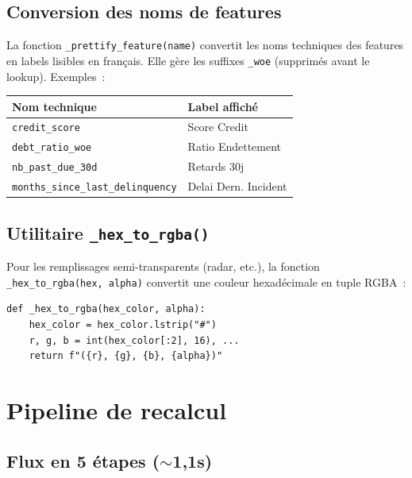 \documentclass[12pt,a4paper]{article}
\begin{document}
\subsection{Conversion des noms de features}

La fonction \texttt{\_prettify\_feature(name)} convertit les noms techniques des features en labels lisibles en fran\c{c}ais. Elle g\`ere les suffixes \texttt{\_woe} (supprim\'es avant le lookup). Exemples~:

\begin{center}
\small
\begin{tabular}{ll}
\toprule
\textbf{Nom technique} & \textbf{Label affich\'e} \\
\midrule
\texttt{credit\_score} & Score Credit \\
\texttt{debt\_ratio\_woe} & Ratio Endettement \\
\texttt{nb\_past\_due\_30d} & Retards 30j \\
\texttt{months\_since\_last\_delinquency} & Delai Dern. Incident \\
\bottomrule
\end{tabular}
\end{center}

\subsection{Utilitaire \texttt{\_hex\_to\_rgba()}}

Pour les remplissages semi-transparents (radar, etc.), la fonction \texttt{\_hex\_to\_rgba(hex, alpha)} convertit une couleur hexad\'ecimale en tuple RGBA~:

\begin{lstlisting}
def _hex_to_rgba(hex_color, alpha):
    hex_color = hex_color.lstrip("#")
    r, g, b = int(hex_color[:2], 16), ...
    return f"({r}, {g}, {b}, {alpha})"
\end{lstlisting}


\section{Pipeline de recalcul}
\label{sec:pipeline}

\subsection{Flux en 5 \'etapes ($\sim$1,1s)}
\end{document}
